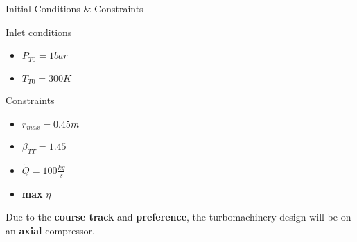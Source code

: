 \begin{frame}{Initial Conditions \& Constraints}
	\begin{block}{Inlet conditions}
		\begin{itemize}
			\item $P_{T0} = 1 bar$
			\item $T_{T0} = 300 K$
		\end{itemize}
	\end{block}
	\begin{alertblock}{Constraints}
		\begin{itemize}
			\item $r_{max} = 0.45 m$
			\item $\beta_{TT} = 1.45$
			\item $\dot{Q} = 100 \frac{kg}{s}$
			\item \textbf{max} $\eta$
		\end{itemize}
	\end{alertblock}
	Due to the \textbf{course track} and \textbf{preference}, the turbomachinery design will be on an \textbf{axial} compressor.
\end{frame}

